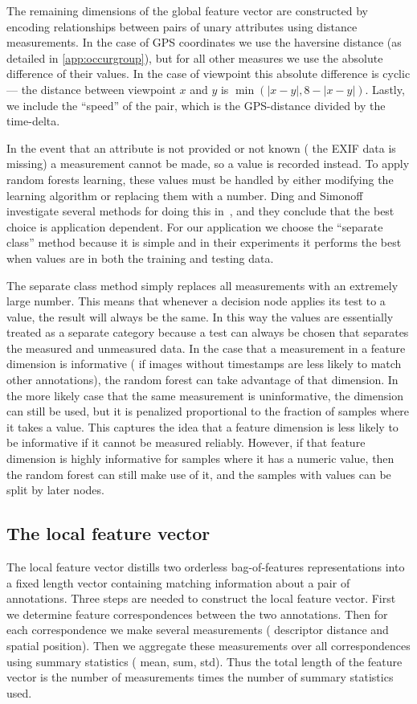 The remaining dimensions of the global feature vector are constructed by encoding relationships between pairs of
  unary attributes using distance measurements.
In the case of GPS coordinates we use the haversine distance (as detailed in \cref{app:occurgroup}), but for all
  other measures we use the absolute difference of their values.
In the case of viewpoint this absolute difference is cyclic  --- \ie{} the distance between viewpoint $x$ and $y$
  is $\min(|x - y|, 8 - |x - y|)$.
Lastly, we include the ``speed'' of the pair, which is the GPS-distance divided by the time-delta.

In the event that an attribute is not provided or not known (\eg{} the EXIF data is missing) a measurement cannot
be made, so a \nan{} value is recorded instead. To apply random forests learning, these \nan{} values must be
handled by either modifying the learning algorithm or replacing them with a number. Ding and Simonoff investigate
several methods for doing this in~\cite{ding_investigation_2010}, and they conclude that the best choice is
application dependent. For our application we choose the ``separate class'' method because it is simple and in
their experiments it performs the best when \nan{} values are in both the training and testing data.

The separate class method simply replaces all \nan{} measurements with an extremely large number. This means that
whenever a decision node applies its test to a \nan{} value, the result will always be the same. In this way the
\nan{} values are essentially treated as a separate category because a test can always be chosen that separates the
measured and unmeasured data. In the case that a \nan{} measurement in a feature dimension is informative (\eg{} if
images without timestamps are less likely to match other annotations), the random forest can take advantage of that
dimension. In the more likely case that the same \nan{} measurement is uninformative, the dimension can still be
used, but it is penalized proportional to the fraction of samples where it takes a \nan{} value. This captures the
idea that a feature dimension is less likely to be informative if it cannot be measured reliably. However, if that
feature dimension is highly informative for samples where it has a numeric value, then the random forest can still
make use of it, and the samples with \nan{} values can be split by later nodes.

\subsection{The local feature vector}
The local feature vector distills two orderless bag-of-features representations into a fixed length vector
  containing matching information about a pair of annotations.
Three steps are needed to construct the local feature vector.
First we determine feature correspondences between the two annotations.
Then for each correspondence we make several measurements (\eg{} descriptor distance and spatial position).
Then we aggregate these measurements over all correspondences using summary statistics (\eg{} mean, sum, std).
Thus the total length of the feature vector is the number of measurements times the number of summary statistics
  used.


